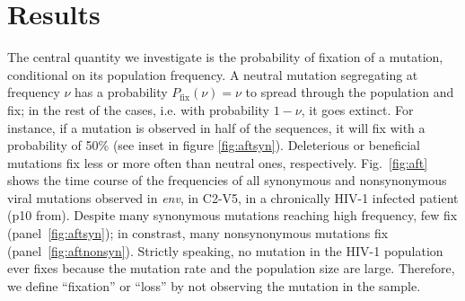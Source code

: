 \documentclass[rmp, twocolumn]{revtex4}
\newcommand{\pfix}{P_{\mathrm{fix}}}
\newcommand{\FIG}[1]{Fig.~\ref{fig:#1}}
\newcommand{\env}{\textit{env}}
\newcommand{\shankaregion}{C2-V5}
\begin{document}
\section{Results}
The central quantity we investigate is the probability of fixation of a
mutation, conditional on its population frequency. A neutral mutation
segregating at frequency $\nu$ has a probability $\pfix(\nu) = \nu$ to
spread through the population and fix; in the rest of the cases, i.e. with
probability $1-\nu$, it goes extinct. For instance, if a mutation is observed in
half of the sequences, it will fix with a probability of 50\% (see inset in
figure \ref{fig:aftsyn}).
Deleterious or
beneficial mutations fix less or more often than neutral ones, respectively.
\FIG{aft} shows the time course of the frequencies of all synonymous and
nonsynonymous viral mutations observed in \env, in \shankaregion, in a chronically
HIV-1 infected patient (p10 from\citet{shankarappa_consistent_1999}). Despite many synonymous
mutations reaching high frequency, few fix (panel~\ref{fig:aftsyn}); in
constrast, many nonsynonymous mutations fix (panel~\ref{fig:aftnonsyn}).
Strictly speaking, no mutation in the HIV-1 population ever fixes because the 
mutation rate and the population size are large. Therefore, we define ``fixation'' or ``loss''
by not observing the mutation in the sample.

\end{document}
